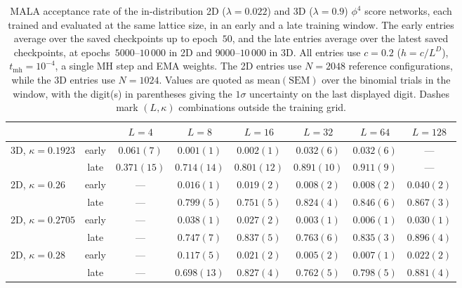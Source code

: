 \documentclass[reprint,twocolumn,superscriptaddress,preprintnumbers,amsmath,amssymb,aps,prd,floatfix]{revtex4-2}
\begin{document}
\begin{table}[t]
\centering
\caption{MALA acceptance rate of the in-distribution 2D ($\lambda=0.022$) and 3D ($\lambda=0.9$) $\phi^4$ score networks, each trained and evaluated at the same lattice size, in an early and a late training window. The early entries average over the saved checkpoints up to epoch~$50$, and the late entries average over the latest saved checkpoints, at epochs~$5000$--$10\,000$ in 2D and $9000$--$10\,000$ in 3D. All entries use $c=0.2$ ($h=c/L^D$), $t_{\text{mh}}=10^{-4}$, a single MH step and EMA weights. The 2D entries use $N=2048$ reference configurations, while the 3D entries use $N=1024$. Values are quoted as mean$(\text{SEM})$ over the binomial trials in the window, with the digit(s) in parentheses giving the $1\sigma$ uncertainty on the last displayed digit. Dashes mark $(L,\kappa)$ combinations outside the training grid.}
\label{tab:acc_early_late}
\begin{tabular}{lccccccc}
\toprule
                                    &       & $L=4$       & $L=8$       & $L=16$      & $L=32$      & $L=64$      & $L=128$     \\
\midrule
\multirow{2}{*}{3D, $\kappa=0.1923$} & early & $0.061(7)$  & $0.001(1)$  & $0.002(1)$  & $0.032(6)$  & $0.032(6)$  & ---         \\
                                    & late  & $0.371(15)$ & $0.714(14)$ & $0.801(12)$ & $0.891(10)$ & $0.911(9)$  & ---         \\
\midrule
\multirow{2}{*}{2D, $\kappa=0.26$}   & early & ---         & $0.016(1)$  & $0.019(2)$  & $0.008(2)$  & $0.008(2)$  & $0.040(2)$  \\
                                    & late  & ---         & $0.799(5)$  & $0.751(5)$  & $0.824(4)$  & $0.846(6)$  & $0.867(3)$  \\
\midrule
\multirow{2}{*}{2D, $\kappa=0.2705$} & early & ---         & $0.038(1)$  & $0.027(2)$  & $0.003(1)$  & $0.006(1)$  & $0.030(1)$  \\
                                    & late  & ---         & $0.747(7)$  & $0.837(5)$  & $0.763(6)$  & $0.835(3)$  & $0.896(4)$  \\
\midrule
\multirow{2}{*}{2D, $\kappa=0.28$}   & early & ---         & $0.117(5)$  & $0.021(2)$  & $0.005(2)$  & $0.007(1)$  & $0.022(2)$  \\
                                    & late  & ---         & $0.698(13)$ & $0.827(4)$  & $0.762(5)$  & $0.798(5)$  & $0.881(4)$  \\
\bottomrule
\end{tabular}
\end{table}
\end{document}
